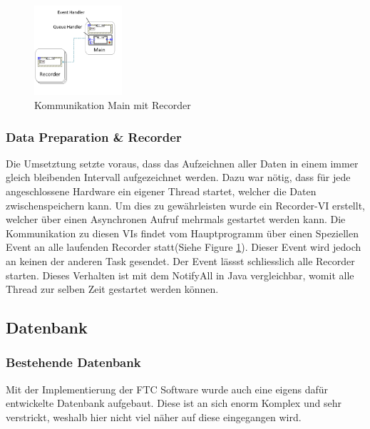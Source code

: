 \documentclass[10pt]{scrartcl}
\begin{document}
\begin{figure}
	\begin{center}
		\includegraphics[width=0.29\textwidth]{LauftzeitansichtRecorderNah}
		\caption{Kommunikation Main mit Recorder}
		\label{fig:LauftzeitansichtRecorder}
	\end{center}
\end{figure}
\subsubsection{Data Preparation \& Recorder}
Die Umsetztung setzte voraus, dass das Aufzeichnen aller Daten in einem immer gleich bleibenden Intervall aufgezeichnet werden. Dazu war nötig, dass für jede angeschlossene Hardware ein eigener Thread startet, welcher die Daten zwischenspeichern kann. Um dies zu gewährleisten wurde ein Recorder-\gls{VI} erstellt, welcher über einen Asynchronen Aufruf mehrmals gestartet werden kann. Die Kommunikation zu diesen \gls{VI}s findet vom Hauptprogramm über einen Speziellen Event an alle laufenden Recorder statt(Siehe Figure \ref{fig:LauftzeitansichtRecorder}). Dieser Event wird jedoch an keinen der anderen Task gesendet. Der Event lässst schliesslich alle Recorder starten. Dieses Verhalten ist mit dem NotifyAll in Java vergleichbar, womit alle Thread zur selben Zeit gestartet werden können. 

\subsection{Datenbank}
\subsubsection{Bestehende Datenbank}
Mit der Implementierung der FTC Software wurde auch eine eigens dafür entwickelte Datenbank aufgebaut. Diese ist an sich enorm Komplex und sehr verstrickt, weshalb hier nicht viel näher auf diese eingegangen wird.
\end{document}

